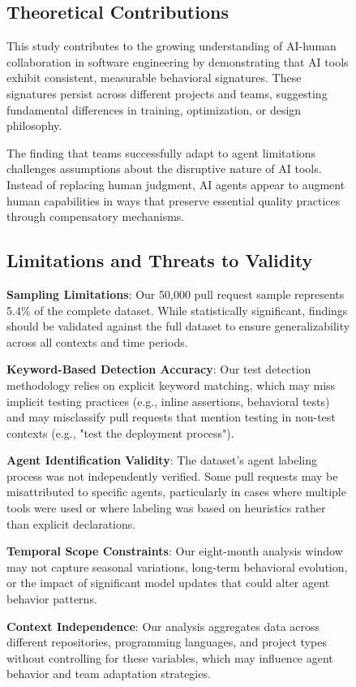 \documentclass[conference]{IEEEtran}
\begin{document}
\begin{figure}[H]
\subsection{Theoretical Contributions}

This study contributes to the growing understanding of AI-human collaboration in software engineering by demonstrating that AI tools exhibit consistent, measurable behavioral signatures. These signatures persist across different projects and teams, suggesting fundamental differences in training, optimization, or design philosophy.

The finding that teams successfully adapt to agent limitations challenges assumptions about the disruptive nature of AI tools. Instead of replacing human judgment, AI agents appear to augment human capabilities in ways that preserve essential quality practices through compensatory mechanisms.

\subsection{Limitations and Threats to Validity}

\textbf{Sampling Limitations}: Our 50,000 pull request sample represents 5.4\% of the complete dataset. While statistically significant, findings should be validated against the full dataset to ensure generalizability across all contexts and time periods.

\textbf{Keyword-Based Detection Accuracy}: Our test detection methodology relies on explicit keyword matching, which may miss implicit testing practices (e.g., inline assertions, behavioral tests) and may misclassify pull requests that mention testing in non-test contexts (e.g., "test the deployment process").

\textbf{Agent Identification Validity}: The dataset's agent labeling process was not independently verified. Some pull requests may be misattributed to specific agents, particularly in cases where multiple tools were used or where labeling was based on heuristics rather than explicit declarations.

\textbf{Temporal Scope Constraints}: Our eight-month analysis window may not capture seasonal variations, long-term behavioral evolution, or the impact of significant model updates that could alter agent behavior patterns.

\textbf{Context Independence}: Our analysis aggregates data across different repositories, programming languages, and project types without controlling for these variables, which may influence agent behavior and team adaptation strategies.


\end{figure}
\end{document}
